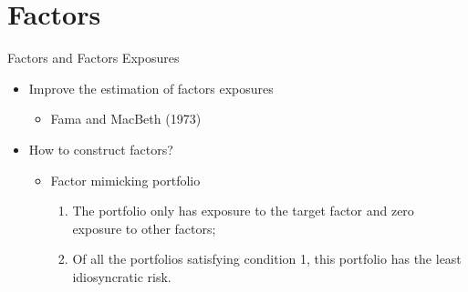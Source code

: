 \documentclass{beamer}
\begin{document}
\section{Factors}

\begin{frame}{Factors and Factors Exposures}

	\begin{itemize}
		\item Improve the estimation of factors exposures
		\begin{itemize}
			\item Fama and MacBeth (1973)
		\end{itemize}
		\item How to construct factors?
		\begin{itemize}
			\item Factor mimicking portfolio
			\begin{enumerate}
				\item The portfolio only has exposure to the target factor and zero exposure to other factors;
				\item Of all the portfolios satisfying condition 1, this portfolio has the least idiosyncratic risk.
			\end{enumerate}
		\end{itemize}
	\end{itemize}
\end{frame}

\begin{frame}
\begin{table}[H]
	\small
	\centering
\end{table}
\end{frame}
\end{document}

